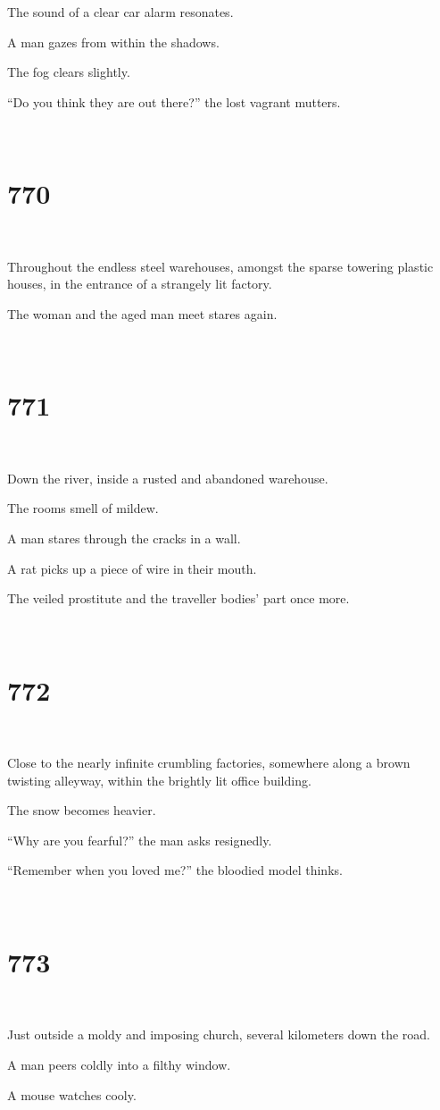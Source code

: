 \documentclass{report}
\begin{document}
The sound of a clear car alarm resonates.

A man gazes from within the shadows.

The fog clears slightly.

``Do you think they are out there?'' the lost vagrant mutters.

~
\chapter*{770}
~

Throughout the endless steel warehouses, amongst the sparse towering plastic houses, in the entrance of a strangely lit factory.

The woman and the aged man meet stares again.

~
\chapter*{771}
~

Down the river, inside a rusted and abandoned warehouse.

The rooms smell of mildew.

A man stares through the cracks in a wall.

A rat picks up a piece of wire in their mouth.

The veiled prostitute and the traveller bodies' part once more.

~
\chapter*{772}
~

Close to the nearly infinite crumbling factories, somewhere along a brown twisting alleyway, within the brightly lit office building.

The snow becomes heavier.

``Why are you fearful?'' the man asks resignedly.

``Remember when you loved me?'' the bloodied model thinks.

~
\chapter*{773}
~

Just outside a moldy and imposing church, several kilometers down the road.

A man peers coldly into a filthy window.

A mouse watches cooly.
\end{document}

